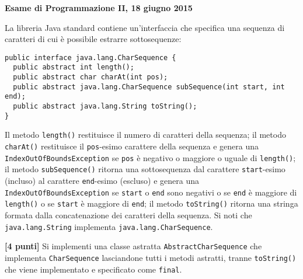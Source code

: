 \documentclass{article}[10pt]
\newcounter{esnu}
\newenvironment{esercizio}{\medskip \noindent {\bf Esercizio\addtocounter{esnu}{1} \arabic{esnu}}}{}
\begin{document}
\begin{center} {\bf Esame di Programmazione II, 18 giugno 2015}\end{center}

La libreria Java standard contiene un'interfaccia che specifica una sequenza di caratteri di cui \`e possibile
estrarre sottosequenze:

{\small
\begin{verbatim}
public interface java.lang.CharSequence {
  public abstract int length();
  public abstract char charAt(int pos);
  public abstract java.lang.CharSequence subSequence(int start, int end);
  public abstract java.lang.String toString();
}
\end{verbatim}
}

\noindent
Il metodo \texttt{length()} restituisce il numero di caratteri della sequenza; il metodo \texttt{charAt()}
restituisce il \texttt{pos}-esimo carattere della sequenza e genera una \texttt{IndexOutOfBoundsException} se
\texttt{pos} \`e negativo o maggiore o uguale di \texttt{length()}; il metodo \texttt{subSequence()}
ritorna una sottosequenza dal carattere \texttt{start}-esimo (incluso) al carattere \texttt{end}-esimo (escluso)
e genera una \texttt{IndexOutOfBoundsException} se \texttt{start} o \texttt{end} sono
negativi o se \texttt{end} \`e maggiore di \texttt{length()} o se \texttt{start} \`e maggiore di \texttt{end};
il metodo \texttt{toString()} ritorna una stringa formata dalla concatenazione dei caratteri della sequenza.
Si noti che \texttt{java.lang.String} implementa \texttt{java.lang.CharSequence}.

\begin{esercizio}
\textbf{[4 punti]}
%
Si implementi una classe astratta \texttt{AbstractCharSequence}
che implementa \texttt{CharSequence} lasciandone tutti i metodi
astratti, tranne \texttt{toString()} che viene implementato e specificato come \texttt{final}.
\end{esercizio}
\end{document}

